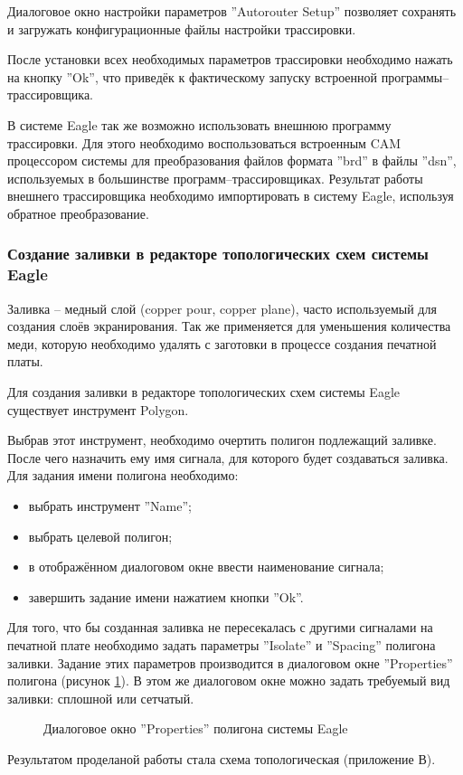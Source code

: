Диалоговое окно настройки параметров ''Autorouter Setup'' позволяет сохранять и загружать
конфигурационные файлы настройки трассировки.

После установки всех необходимых параметров трассировки необходимо нажать на кнопку
''Ok'', что приведёк к фактическому запуску встроенной программы--трассировщика.

В системе Eagle так же возможно использовать внешнюю программу трассировки.
Для этого необходимо воспользоваться встроенным CAM процессором системы для
преобразования файлов формата ''brd'' в файлы ''dsn'', используемых в большинстве
программ--трассировщиках. Результат работы внешнего трассировщика необходимо
импортировать в систему Eagle, используя обратное преобразование.

\subsubsection{Создание заливки в редакторе топологических схем системы Eagle}
Заливка -- медный слой (copper pour, copper plane), часто используемый для создания
слоёв экранирования. Так же применяется для уменьшения количества меди, которую
необходимо удалять с заготовки в процессе создания печатной платы.

Для создания заливки в редакторе топологических схем системы Eagle существует
инструмент Polygon.

Выбрав этот инструмент, необходимо очертить полигон подлежащий заливке. После чего
назначить ему имя сигнала, для которого будет создаваться заливка. Для задания имени
полигона необходимо:
\begin{itemize}
	\item{} выбрать инструмент ''Name'';
	\item{} выбрать целевой полигон;
	\item{} в отображённом диалоговом окне ввести наименование сигнала;
	\item{} завершить задание имени нажатием кнопки ''Ok''.
\end{itemize}
Для того, что бы созданная заливка не пересекалась с другими сигналами на печатной
плате необходимо задать параметры ''Isolate'' и ''Spacing'' полигона заливки. Задание
этих параметров производится в диалоговом окне ''Properties''
полигона (рисунок \ref{img:polyProperty}). В этом же диалоговом окне можно задать требуемый вид
заливки: сплошной или сетчатый.
\begin{figure}[h]
	\caption{Диалоговое окно ''Properties'' полигона системы Eagle}
	\label{img:polyProperty}
\end{figure}


Результатом проделаной работы стала схема топологическая (приложение В).
